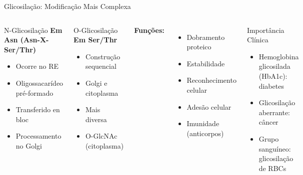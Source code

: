 \begin{frame}[shrink=10]{Glicosilação: Modificação Mais Complexa}
\begin{columns}
\begin{block}{N-Glicosilação}
\textbf{Em Asn (Asn-X-Ser/Thr)}
\begin{itemize}
    \item Ocorre no RE
    \item Oligossacarídeo pré-formado
    \item Transferido en bloc
    \item Processamento no Golgi
\end{itemize}
\end{block}

\begin{block}{O-Glicosilação}
\textbf{Em Ser/Thr}
\begin{itemize}
    \item Construção sequencial
    \item Golgi e citoplasma
    \item Mais diversa
    \item O-GlcNAc (citoplasma)
\end{itemize}
\end{block}

\textbf{Funções:}
\begin{itemize}
    \item Dobramento proteico
    \item Estabilidade
    \item Reconhecimento celular
    \item Adesão celular
    \item Imunidade (anticorpos)
\end{itemize}

\vspace{0.3cm}

\begin{exampleblock}{Importância Clínica}
\begin{itemize}
    \item Hemoglobina glicosilada (HbA1c): diabetes
    \item Glicosilação aberrante: câncer
    \item Grupo sanguíneo: glicosilação de RBCs
\end{itemize}
\end{exampleblock}
\end{columns}
\end{frame}

